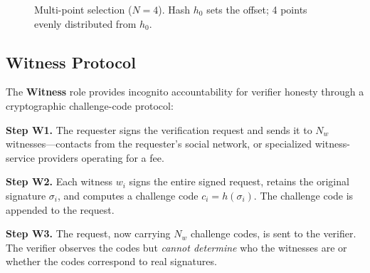 \documentclass[11pt,a4paper,twocolumn]{article}
\begin{document}
\begin{figure}[ht]
\centering
{}
\caption{Multi-point selection ($N{=}4$). Hash $h_0$ sets the offset; 4 points evenly distributed from $h_0$.}
\label{fig:multipoint}
\end{figure}

\subsection{Witness Protocol}

The \textbf{Witness} role provides incognito accountability for verifier honesty through a cryptographic challenge-code protocol:

\textbf{Step W1.} The requester signs the verification request and sends it to $N_w$ witnesses---contacts from the requester's social network, or specialized witness-service providers operating for a fee.

\textbf{Step W2.} Each witness $w_i$ signs the entire signed request, retains the original signature $\sigma_i$, and computes a challenge code $c_i = h(\sigma_i)$. The challenge code is appended to the request.

\textbf{Step W3.} The request, now carrying $N_w$ challenge codes, is sent to the verifier. The verifier observes the codes but \emph{cannot determine} who the witnesses are or whether the codes correspond to real signatures.
\end{document}
